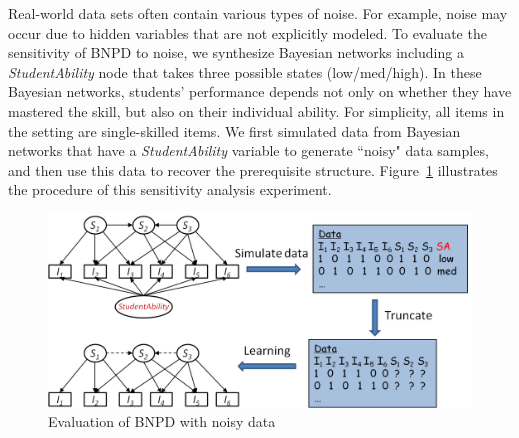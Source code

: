 \documentclass{edm_template}
\newcommand{\hl}[1]{\colorbox{yellow}{#1}}
\begin{document}
{	%
	Real-world data sets often contain various types of noise.
	For example,  noise may occur due to hidden variables that are not explicitly modeled. 
	To evaluate the sensitivity of BNPD to noise, we synthesize Bayesian networks including a  \emph{StudentAbility} node that takes three possible states (low/med/high). 
	In these Bayesian networks, students' performance depends not only on whether they have mastered the skill, but also on their individual ability. %
	For simplicity, all items in the setting are single-skilled items. 
	We first simulated data from  Bayesian networks that have a  \emph{StudentAbility} variable to generate ``noisy" data samples, and 
	then use this data to recover the prerequisite structure. %
	Figure~\ref{fig:stuabilitymodel} illustrates the procedure of this sensitivity analysis experiment.
	
			\begin{figure}[!ht]
				\begin{center}
					\includegraphics[width=1.0\linewidth]{figures/studentability.png}
				\end{center}
				\caption{Evaluation of BNPD with noisy data} 
				\label{fig:stuabilitymodel}
			\end{figure}
			
}
\end{document}
